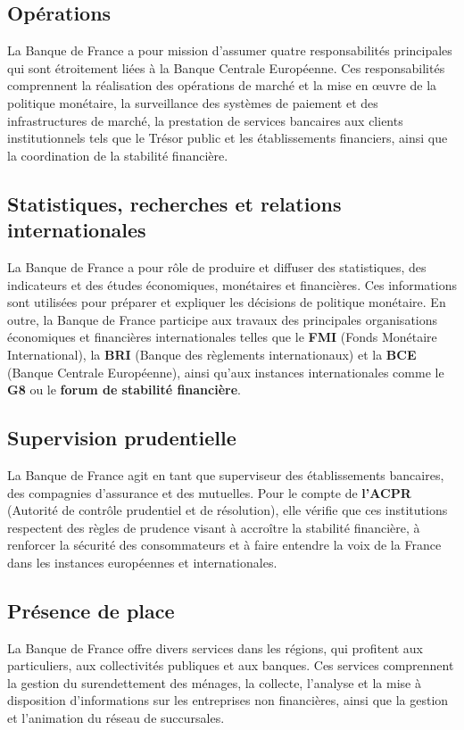 \documentclass{report}
\begin{document}
\subsection{Opérations}
La Banque de France a pour mission d'assumer quatre responsabilités principales qui sont étroitement liées à la Banque Centrale Européenne. Ces responsabilités comprennent la réalisation des opérations de marché et la mise en œuvre de la politique monétaire, la surveillance des systèmes de paiement et des infrastructures de marché, la prestation de services bancaires aux clients institutionnels tels que le Trésor public et les établissements financiers, ainsi que la coordination de la stabilité financière.

\subsection{Statistiques, recherches et relations internationales}
La Banque de France a pour rôle de produire et diffuser des statistiques, des indicateurs et des études économiques, monétaires et financières. Ces informations sont utilisées pour préparer et expliquer les décisions de politique monétaire. En outre, la Banque de France participe aux travaux des principales organisations économiques et financières internationales telles que le \textbf{FMI} (Fonds Monétaire International), la \textbf{BRI} (Banque des règlements internationaux) et la \textbf{BCE} (Banque Centrale Européenne), ainsi qu'aux instances internationales comme le \textbf{G8} ou le \textbf{forum de stabilité financière}.

\subsection{Supervision prudentielle}
La Banque de France agit en tant que superviseur des établissements bancaires, des compagnies d'assurance et des mutuelles. Pour le compte de \textbf{l'ACPR} (Autorité de contrôle prudentiel et de résolution), elle vérifie que ces institutions respectent des règles de prudence visant à accroître la stabilité financière, à renforcer la sécurité des consommateurs et à faire entendre la voix de la France dans les instances européennes et internationales.

\subsection{Présence de place}
La Banque de France offre divers services dans les régions, qui profitent aux particuliers, aux collectivités publiques et aux banques. Ces services comprennent la gestion du surendettement des ménages, la collecte, l'analyse et la mise à disposition d'informations sur les entreprises non financières, ainsi que la gestion et l'animation du réseau de succursales.
\end{document}

